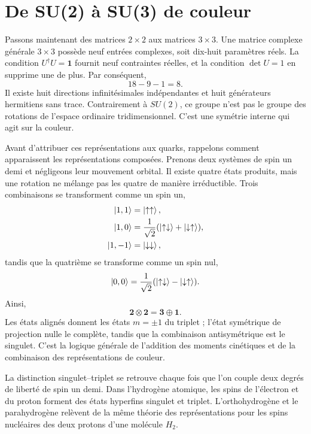 \section{De SU(2) à SU(3) de couleur}

Passons maintenant des matrices \(2\times2\) aux matrices \(3\times3\). Une matrice complexe générale \(3\times3\) possède neuf entrées complexes, soit dix-huit paramètres réels. La condition \(U^\dagger U=\boldsymbol 1\) fournit neuf contraintes réelles, et la condition \(\det U=1\) en supprime une de plus. Par conséquent,
\begin{equation}
18-9-1=8.
\end{equation}
Il existe huit directions infinitésimales indépendantes et huit générateurs hermitiens sans trace. Contrairement à \(SU(2)\), ce groupe n’est pas le groupe des rotations de l’espace ordinaire tridimensionnel. C’est une symétrie interne qui agit sur la couleur.

Avant d’attribuer ces représentations aux quarks, rappelons comment apparaissent les représentations composées. Prenons deux systèmes de spin un demi et négligeons leur mouvement orbital. Il existe quatre états produits, mais une rotation ne mélange pas les quatre de manière irréductible. Trois combinaisons se transforment comme un spin un,
\begin{align}
\left\lvert1,1\right\rangle&=\left\lvert\uparrow\uparrow\right\rangle,\\
\left\lvert1,0\right\rangle&=\frac{1}{\sqrt2}
(\left\lvert\uparrow\downarrow\right\rangle+\left\lvert\downarrow\uparrow\right\rangle),\\
\left\lvert1,-1\right\rangle&=\left\lvert\downarrow\downarrow\right\rangle,
\end{align}
tandis que la quatrième se transforme comme un spin nul,
\begin{equation}
\left\lvert0,0\right\rangle=\frac{1}{\sqrt2}
(\left\lvert\uparrow\downarrow\right\rangle-\left\lvert\downarrow\uparrow\right\rangle).
\end{equation}
Ainsi,
\begin{equation}
\boldsymbol 2\otimes\boldsymbol 2
=\boldsymbol 3\oplus\boldsymbol 1.
\label{eq:l4-two-spin-decomposition}
\end{equation}
Les états alignés donnent les états \(m=\pm1\) du triplet ; l’état symétrique de projection nulle le complète, tandis que la combinaison antisymétrique est le singulet. C’est la logique générale de l’addition des moments cinétiques et de la combinaison des représentations de couleur.

La distinction singulet--triplet se retrouve chaque fois que l’on couple deux degrés de liberté de spin un demi. Dans l’hydrogène atomique, les spins de l’électron et du proton forment des états hyperfins singulet et triplet. L’orthohydrogène et le parahydrogène relèvent de la même théorie des représentations pour les spins nucléaires des deux protons d’une molécule \(H_2\).

